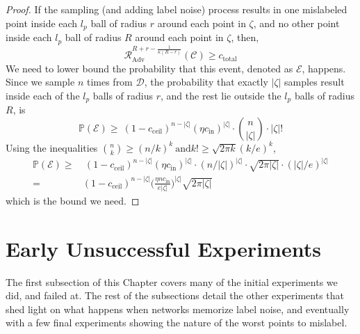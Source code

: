 \documentclass[12pt, oneside]{book}
\begin{document}
\begin{proof}
If the sampling (and adding label noise) process results in one mislabeled point
inside each $l_p$ ball of radius $r$ around each point in $\zeta$, and no other
point inside each $l_p$ ball of radius $R$ around each point in $\zeta$, then,
\begin{equation*}
    \mathcal{R}_{\text{Adv}}^{R+r-\frac{1}{\kappa(R-r)}}
    (\mathcal{C}) \geq
    c_{\text{total}}
\end{equation*}
We need to lower bound the probability that this event, denoted as
$\mathcal{E}$, happens. Since we sample $n$ times from $\mathcal{D}$, the
probability that exactly $|\zeta|$ samples result inside each of the $l_p$ balls
of radius $r$, and the rest lie outside the $l_p$ balls of radius $R$, is
\begin{equation*}
        \mathbb{P}(\mathcal{E})
        \geq 
        ~(1-c_{\text{ceil}})^{n-|\zeta|}
        (\eta c_\text{in})^{|\zeta|} \cdot {n \choose |\zeta|} \cdot |\zeta|!
\end{equation*}
Using the inequalities ${n \choose k} \geq (n/k)^k~\text{and} k! \geq \sqrt{2\pi
k}(k/e)^k$,
\begin{equation*}
    \begin{split}
        \mathbb{P}(\mathcal{E})
        \geq &
        ~(1-c_{\text{ceil}})^{n-|\zeta|}
        (\eta c_\text{in})^{|\zeta|} \cdot {(n/|\zeta|)^{|\zeta|}} \cdot
        \sqrt{2\pi |\zeta|}\cdot(|\zeta|/e)^{|\zeta|} \\
        = &
        (1-c_{\text{ceil}})^{n-|\zeta|}
        \biggl (
            \frac{\eta n c_{\text{in}}}{e |\zeta|}
        \biggr )^{|\zeta|}
        \sqrt{2 \pi |\zeta|}
    \end{split}
\end{equation*}
which is the bound we need.
\end{proof}





\chapter{Early Unsuccessful Experiments}
The first subsection of this Chapter covers many of the initial experiments we
did, and failed at. The rest of the subsections detail the other experiments
that shed light on what happens when networks memorize label noise, and
eventually with a few final experiments showing the nature of the worst points
to mislabel.
\end{document}
